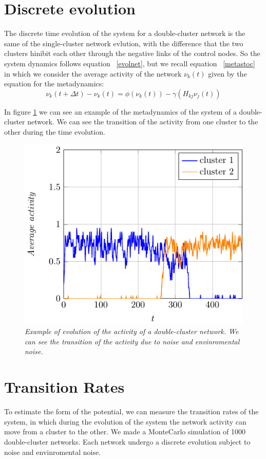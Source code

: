 \section{Discrete evolution}
The discrete time evolution of the system for a double-cluster network is the same of the single-cluster network evlution, with the difference that the two clusters hinibit each other through the negative links of the control nodes.
So the system dynamics follows equation ~\eqref{evolnet}, but we recall equation ~\eqref{metastoc} in which we consider the average activity of the network $\nu_k(t)$ given by the equation for the metadynamics:
$$
\nu_k(t+\Delta t)-\nu_k(t)=\phi(\nu_k(t))-\gamma\left (H_{kj}\nu_j(t)\right )
$$

In figure \ref{fig:metad} we can see an example of the metadynamics of the system of a double-cluster network. We can see the transition of the activity from one cluster to the other during the time evolution.
\begin{figure}[H]
\centering
\includegraphics[scale=1.2]{images/metad.pdf}
\caption{\emph{Example of evolution of the activity of a double-cluster network. We can see the transition of the activity due to noise and envinromental noise.}}
\label{fig:metad}
\end{figure}


\section{Transition Rates}
To estimate the form of the potential, we can measure the transition rates of the system, in which during the evolution of the system the network activity can move from a cluster to the other.
We made a MonteCarlo simulation of 1000 double-cluster networks. Each network undergo a discrete evolution subject to noise and envinromental noise.



